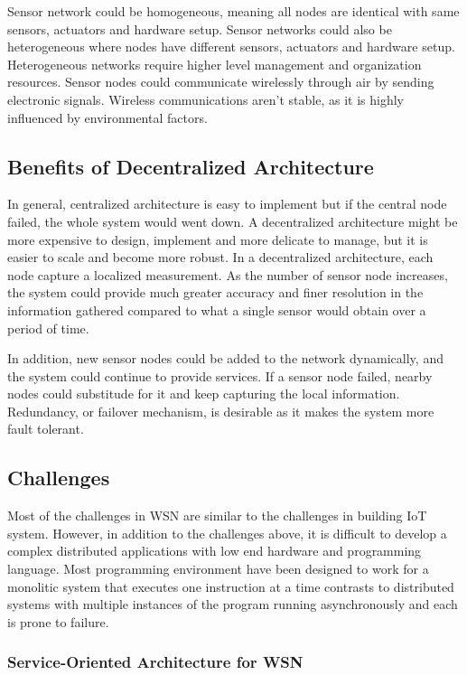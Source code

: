 Sensor network could be homogeneous, meaning all nodes are identical with same
sensors, actuators and hardware setup. Sensor networks could also be
heterogeneous where nodes have different sensors, actuators and hardware setup.
Heterogeneous networks require higher level management and organization
resources. Sensor nodes could communicate wirelessly through air by
sending electronic signals. Wireless communications aren't stable, as it is
highly influenced by environmental factors.

\subsection{Benefits of Decentralized Architecture}

In general, centralized architecture is easy to implement but if the central
node failed, the whole system would went down. A decentralized architecture
might be more expensive to design, implement and more delicate to manage, but it
is easier to scale and become more robust. In a decentralized architecture, each
node capture a localized measurement. As the number of sensor node increases,
     the system could provide much greater accuracy and finer resolution in the
     information gathered compared to what a single sensor would obtain over
     a period of time.

In addition, new sensor nodes could be added to the network dynamically, and
the system could continue to provide services. If a sensor node failed, nearby
nodes could substitude for it and keep capturing the local information.
Redundancy, or failover mechanism, is desirable as it makes the system more
fault tolerant.

\subsection{Challenges}

Most of the challenges in WSN are similar to the challenges in building IoT
system.  However, in addition to the challenges above, it is difficult to
develop a complex distributed applications with low end hardware and programming
language. Most programming environment have been designed to work for
a monolitic system that executes one instruction at a time contrasts to
distributed systems with multiple instances of the program running
asynchronously and each is prone to failure.

\subsubsection{Service-Oriented Architecture for WSN}

